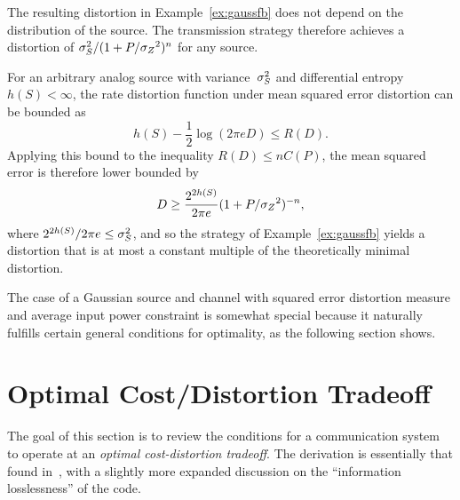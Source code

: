 \begin{remark}
  \label{rem:snrscalingfeedback}
  The resulting distortion in Example~\ref{ex:gaussfb} does not depend on the
  distribution of the source. The transmission strategy therefore achieves a
  distortion of ${\sigma_S^2}/(1+P/{{\sigma_Z}^2})^n$ for any source. 

  For an arbitrary analog source with variance~${\sigma_S^2}$ and differential entropy
  $h(S) < \infty$, the rate distortion function under mean squared error
  distortion can be bounded as~\cite{Shannon1959}
  \begin{equation*}
    h(S) - \frac12 \log(2\pi e D) \le R(D).
  \end{equation*}
  Applying this bound to the inequality $R(D) \le nC(P)$, the mean squared error
  is therefore lower bounded by
  \begin{equation*}
    D \ge \frac{2^{2h(S)}}{2\pi e} (1 + P/{{\sigma_Z}^2})^{-n},
  \end{equation*}
  where $2^{2h(S)}/2\pi e \le {\sigma_S^2}$, and so the strategy of
  Example~\ref{ex:gaussfb} yields a distortion that is at most a constant
  multiple of the theoretically minimal distortion.
\end{remark}

The case of a Gaussian source and channel with squared error distortion measure
and average input power constraint is somewhat special because it naturally
fulfills certain general conditions for optimality, as the following section
shows. 


\section{Optimal Cost/Distortion Tradeoff}
\label{sec:fboptimality}

The goal of this section is to review the conditions for a communication system
to operate at an \emph{optimal cost-distortion tradeoff}. The derivation is
essentially that found in~\cite[Section~3.5]{GastparThesis}, with a slightly
more expanded discussion on the ``information losslessness'' of the code.

